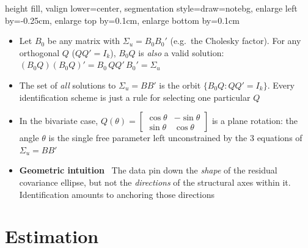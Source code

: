 \documentclass[10pt,handout]{beamer}
\newcommand{\noteboxcenter}{\vspace*{0.9cm}}
\begin{document}
\begin{frame}
\centering
\begin{notebox}{height fill, valign lower=center, segmentation style={draw=notebg}, enlarge left by=-0.25cm, enlarge top by=0.1cm, enlarge bottom by=0.1cm}
\tcblower
\begin{itemize}
\item Let $B_0$ be any matrix with $\Sigma_u = B_0 B_0'$ (e.g.\ the Cholesky factor). For any orthogonal $Q$ ($QQ'=I_k$), $B_0Q$ is \textit{also} a valid solution: $(B_0Q)(B_0Q)' = B_0\,QQ'\,B_0' = \Sigma_u$\bigskip
\item The set of \textit{all} solutions to $\Sigma_u=BB'$ is the orbit $\{B_0 Q : QQ'=I_k\}$. Every identification scheme is just a rule for selecting one particular $Q$\bigskip
\item In the bivariate case, $Q(\theta)=\left[\begin{smallmatrix}\cos\theta & -\sin\theta \\ \sin\theta & \cos\theta\end{smallmatrix}\right]$ is a plane rotation: the angle $\theta$ is the single free parameter left unconstrained by the 3 equations of $\Sigma_u=BB'$\bigskip
\item \textbf{Geometric intuition} \ The data pin down the \textit{shape} of the residual covariance ellipse, but not the \textit{directions} of the structural axes within it. Identification amounts to anchoring those directions
\end{itemize}
\noteboxcenter
\end{notebox}
\end{frame}
\shownotesblock{}

\section{Estimation}
\begin{frame}
\color{title} 
\end{frame}
\shownotesblock{}
\end{document}
